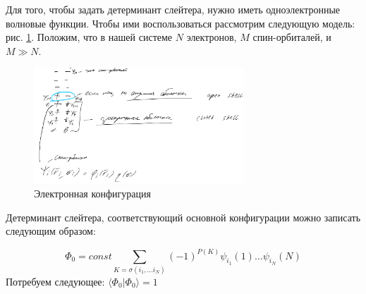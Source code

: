 \documentclass[12pt, oneside]{article}
\numberwithin{equation}{section}  %
\begin{document}
Для того, чтобы задать детерминант слейтера, нужно иметь одноэлектронные волновые функции. Чтобы ими воспользоваться рассмотрим следующую модель: рис. \ref{fig:spinorbitals}. Положим, что в нашей системе \(N\) электронов, \(M\) спин-орбиталей, и \(M \gg N\).

\begin{figure}
    \centering
    \includegraphics[width=0.7\textwidth]{./images/spin-orbitals.png}
    \caption{Электронная конфигурация}
    \label{fig:spinorbitals}
\end{figure}

Детерминант слейтера, соответствующий основной конфигурации можно записать следующим образом: 

\begin{equation}
\Phi_0 = const \sum_{K = \sigma(i_1, \dots i_N)} (-1)^{P(K)} \psi_{i_1}(1) \dots \psi_{i_N}(N)
\end{equation}
Потребуем следующее: \(\langle \Phi_0 | \Phi_0 \rangle = 1\)
\end{document}
